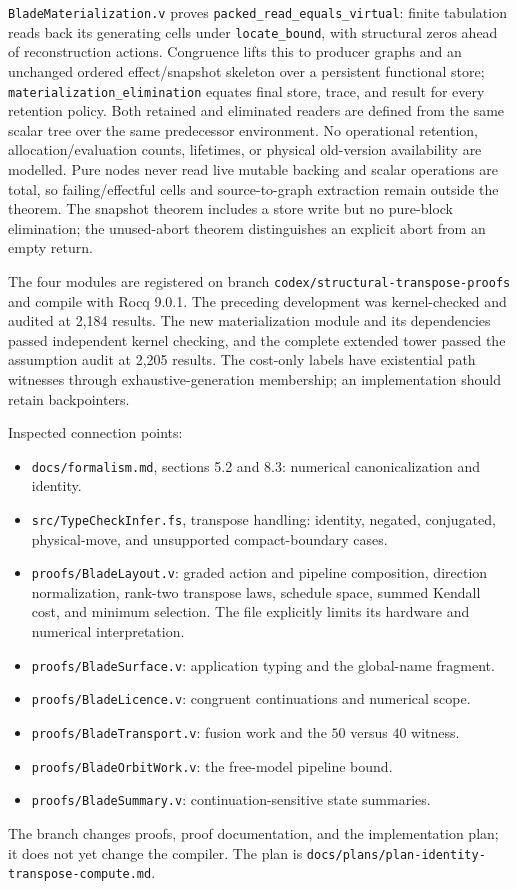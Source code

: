 \documentclass[11pt]{article}
\begin{document}
\texttt{BladeMaterialization.v} proves \texttt{packed\_read\_equals\_virtual}: finite tabulation reads back its generating cells under \texttt{locate\_bound}, with structural zeros ahead of reconstruction actions. Congruence lifts this to producer graphs and an unchanged ordered effect/snapshot skeleton over a persistent functional store; \texttt{materialization\_elimination} equates final store, trace, and result for every retention policy. Both retained and eliminated readers are defined from the same scalar tree over the same predecessor environment. No operational retention, allocation/evaluation counts, lifetimes, or physical old-version availability are modelled. Pure nodes never read live mutable backing and scalar operations are total, so failing/effectful cells and source-to-graph extraction remain outside the theorem. The snapshot theorem includes a store write but no pure-block elimination; the unused-abort theorem distinguishes an explicit abort from an empty return.

The four modules are registered on branch
\texttt{codex/structural-transpose-proofs} and compile with Rocq 9.0.1.
The preceding development was kernel-checked and audited at 2,184 results.
The new materialization module and its dependencies passed independent kernel
checking, and the complete extended tower passed the assumption audit at
2,205 results. The cost-only labels have existential path
witnesses through exhaustive-generation membership; an implementation should
retain backpointers.

Inspected connection points:
\begin{itemize}
\item \texttt{docs/formalism.md}, sections 5.2 and 8.3: numerical canonicalization and identity.
\item \texttt{src/TypeCheckInfer.fs}, transpose handling: identity, negated, conjugated, physical-move, and unsupported compact-boundary cases.
\item \texttt{proofs/BladeLayout.v}: graded action and pipeline composition, direction normalization, rank-two transpose laws, schedule space, summed Kendall cost, and minimum selection. The file explicitly limits its hardware and numerical interpretation.
\item \texttt{proofs/BladeSurface.v}: application typing and the global-name fragment.
\item \texttt{proofs/BladeLicence.v}: congruent continuations and numerical scope.
\item \texttt{proofs/BladeTransport.v}: fusion work and the $50$ versus $40$ witness.
\item \texttt{proofs/BladeOrbitWork.v}: the free-model pipeline bound.
\item \texttt{proofs/BladeSummary.v}: continuation-sensitive state summaries.
\end{itemize}
The branch changes proofs, proof documentation, and the implementation plan;
it does not yet change the compiler. The plan is
\texttt{docs/plans/plan-identity-transpose-compute.md}.
\end{document}
